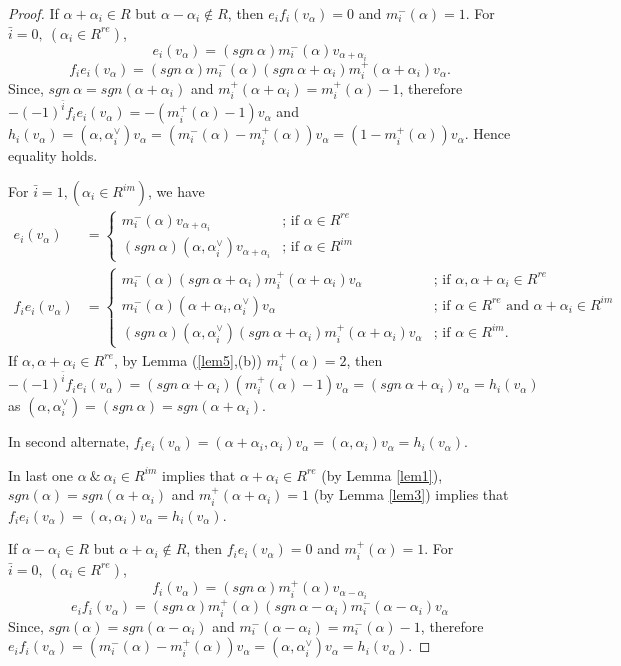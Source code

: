 \documentclass[11pt]{amsart}
\theoremstyle{plain}
\theoremstyle{definition}
\numberwithin{equation}{section}
\newcommand{\al}{\alpha}
\begin{document}
\begin{proof}
		If $\al+\al_i\in R$ but $\al-\al_i\notin R$, then $e_if_i(v_{\al})=0$ and $m_i^-(\al)=1$. For $\bar{i}=0,~(\al_i\in R^{re})$,
		$$e_i(v_\al)=(sgn~\al)m_i^-(\al)v_{\al+\al_i}$$ $$f_ie_i(v_{\al})=(sgn~\al)m_i^-(\al)(sgn~\al+\al_i)m_i^+(\al+\al_i)v_{\al}.$$
		Since, $sgn~\al=sgn(\al+\al_i)$ and $m_i^+(\al+\al_i)=m_i^+(\al)-1$, therefore $-(-1)^{\bar i}f_ie_i(v_{\al})=-(m_i^+(\al)-1)v_{\al}$ and $h_i(v_\al)=(\al,\al_i^{\vee})v_{\al}=(m_i^-{(\al)}-m_i^+(\al))v_{\al}=(1-m_i^+(\al))v_{\al}$. Hence equality holds.
		
		For $\bar{i}=1,(\al_i\in R^{im})$, we have
		\begin{align*}
			e_i(v_{\alpha})&=\begin{cases}
				m_i^-(\alpha)v_{\al+\alpha_i}& \text{; if }\alpha\in R^{re}\\(sgn~\al)(\alpha,\alpha_i^{\vee})v_{\al+\al_i}&\text{; if }\alpha\in R^{im}
			\end{cases}\\
			f_ie_i(v_{\alpha})&=\begin{cases}
				m_i^-(\alpha)(sgn~\al+\al_i)m_i^+(\al+\al_i)v_{\alpha}& \text{; if }\al,\al+\al_i\in R^{re}\\
				m_i^-(\al)(\al+\al_i,\al_i^{\vee})v_{\al}&\text{; if }\al\in R^{re}\text{ and }\al+\al_i\in R^{im}\\
				(sgn~\al)(\al,\al_i^{\vee})(sgn~\al+\al_i)m_i^+(\al+\al_i)v_{\al}&\text{; if }\al\in R^{im}.
			\end{cases}
		\end{align*}		
		If $\al,\al+\al_i\in R^{re}$, by Lemma (\ref{lem5},(b)) $m_i^+(\al)=2$, then $-(-1)^{\bar i}f_ie_i(v_{\al})=(sgn~\al+\al_i)(m_i^+(\al)-1)v_{\al}=(sgn~\al+\al_i)v_{\al}=h_i(v_{\al})$ as $(\al,\al_i^{\vee})=(sgn~\al)=sgn(\al+\al_i)$.
		
		In second alternate,  $f_ie_i(v_{\al})=(\al+\al_i,\al_i)v_{\al}=(\al,\al_i)v_{\al}=h_i(v_{\al})$.
		
		In last one $\al~\&~\al_i\in R^{im}$ implies that $\al+\al_i\in R^{re}$ (by Lemma \ref{lem1}), $sgn(\al)=sgn(\al+\al_i)$ and $m_i^+(\al+\al_i)=1$ (by Lemma \ref{lem3}) implies that $f_ie_i(v_{\al})=(\al,\al_i)v_{\al}=h_i(v_{\al})$.
		
		If $\al-\al_i\in R$ but $\al+\al_i\notin R$, then $f_ie_i(v_{\al})=0$ and $m_i^+(\al)=1$. For $\bar{i}=0,~(\al_i\in R^{re})$,
		$$f_i(v_\al)=(sgn~\al)m_i^+(\al)v_{\al-\al_i}$$
		$$e_if_i(v_{\al})=(sgn~\al)m_i^+(\al)(sgn~\al-\al_i)m_i^-(\al-\al_i)v_{\al}$$
		Since, $sgn(\al)=sgn(\al-\al_i)$ and $m_i^-(\al-\al_i)=m_i^-(\al)-1$, therefore $e_if_i(v_{\al})=(m_i^-(\al)-m_i^+(\al))v_{\al}=(\al,\al_i^{\vee})v_{\al}=h_i(v_{\al})$.
		

\end{proof}
\end{document}
